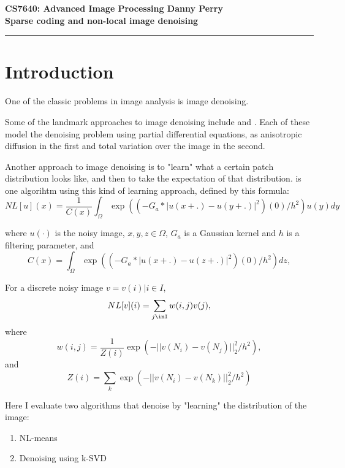 \documentclass[11pt]{article}
\begin{document}
\thispagestyle{empty}
{\large{\bf CS7640: Advanced Image Processing \hfill Danny Perry}}\\

{\LARGE{\bf Sparse coding and non-local image denoising}}
\vspace{0.2\baselineskip}
\hrule

\section{Introduction}
One of the classic problems in image analysis is image denoising.

Some of the landmark approaches to image denoising include \cite{perona1990scale} and \cite{rudin1992nonlinear}.
Each of these model the denoising problem using partial differential equations, as anisotropic diffusion in the first and total variation over the image in the second. 

Another approach to image denoising is to "learn" what a certain patch distribution looks like, and then to take the expectation of that distribution.
\cite{buades2005non} is one algorihtm using this kind of learning approach, defined by this formula:
\begin{equation}
NL[u](x) = \frac{1}{C(x)} \int_{\Omega} \exp( (-G_a*|u(x+.)-u(y+.)|^2)(0) / h^2 ) u(y) dy
\end{equation}

where $u(\cdot)$ is the noisy image, $x,y,z\in \Omega$, $G_a$ is a Gaussian kernel and $h$ is a filtering parameter, and 
\begin{equation*}
C(x) = \int_{\Omega} \exp( (-G_a*|u(x+.)-u(z+.)|^2)(0) / h^2 ) dz,
\end{equation*}

For a discrete noisy image $v = {v(i) | i \in I}$,
\begin{equation}
NL[v](i) = \sum_{j\inI} w(i,j) v(j),
\end{equation}
where
\begin{equation*}
w(i,j) = \frac{1}{Z(i)} \exp( -||v(N_i)-v(N_j)||_2^2 / h^2 ),
\end{equation*}
and
\begin{equation*}
Z(i) = \sum_k \exp( -||v(N_i)-v(N_k)||_2^2 / h^2 )
\end{equation*}


Here I evaluate two algorithms that denoise by "learning" the distribution of the image:
\begin{enumerate}
\item NL-means
\item Denoising using k-SVD
\end{enumerate}
\end{document}
